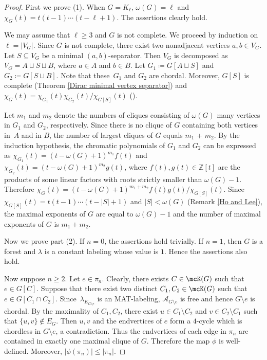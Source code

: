 \begin{proof}
First we prove (1).
When $ G = K_{\ell} $, $ \omega(G) = \ell $ and $ \chi_{G}(t) = t(t-1) \cdots (t-\ell+1) $. 
The assertions clearly hold. 

We may assume that $ \ell \geq 3 $ and $ G $ is not complete. 
We proceed by induction on~$ \ell = |V_{G}| $. 
Since $ G $ is not complete, there exist two nonadjacent vertices $ a,b \in V_{G} $. 
Let $ S \subseteq V_{G} $ be a minimal $ (a,b) $-separator. 
Then $ V_{G} $ is decomposed as $ V_{G} = A \sqcup S \sqcup B $, where $ a \in A $ and $ b \in B $. 
Let $ G_{1} \coloneqq G[A\sqcup S] $ and $ G_{2} \coloneqq G[S \sqcup B] $. 
Note that these~$ G_{1} $ and $ G_{2} $ are chordal. 
Moreover, $ G[S] $ is complete (Theorem \ref{Dirac minimal vertex separator}) and $ \chi_{G}(t) = \chi_{G_{1}}(t)\chi_{G_{2}}(t)/\chi_{G[S]}(t) $ (\eg  \cite[Theorem 3]{Read68}). 

Let $ m_{1} $ and $ m_{2} $ denote the numbers of cliques consisting of $ \omega(G) $ many vertices in $ G_{1} $ and $ G_{2} $, respectively. 
Since there is no clique of $ G $ containing both vertices in~$ A $ and in $ B $, the number of largest cliques of $ G $ equals $ m_{1} $ + $ m_{2} $. 
By the induction hypothesis, the chromatic polynomials of $ G_{1} $ and $ G_{2} $ can be expressed as $ \chi_{G_{1}}(t)  = (t-\omega(G)+1)^{m_{1}} f(t) $ and $ \chi_{G_{2}}(t) = (t-\omega(G)+1)^{m_{2}}g(t) $, where $ f(t), g(t) \in \mathbb{Z}[t] $ are the products of some linear factors with roots strictly smaller than $ \omega(G) -1$. 
Therefore $ \chi_{G}(t) = (t-\omega(G)+1)^{m_{1}+m_{2}}f(t)g(t)/\chi_{G[S]}(t) $. 
Since $ \chi_{G[S]}(t) = t(t-1) \cdots (t-|S|+1) $ and $ |S| < \omega(G) $ (Remark \ref{Ho and Lee}), the maximal exponents of $ G $ are equal to $ \omega(G)-1 $  and the number of maximal exponents of $ G $ is $ m_{1} + m_{2} $. 

Now we prove part (2). If $ n = 0 $, the assertions hold trivially. 
If $ n = 1 $, then $ G $ is a forest and $ \lambda $ is a constant labeling whose value is $ 1 $. 
Hence the assertions also hold. 

Now suppose $ n \geq 2 $. 
Let $ e \in \pi_{n} $. 
Clearly, there exists $ C\in \mcK(G)$ such that $e \in G[C]$.
Suppose that there exist two distinct $ C_{1} ,C_{2} \in \mcK(G)$ such that $ e\in G[C_{1} \cap C_{2}] $. 
Since~$ \lambda_{E_{G \setminus e}} $ is an MAT-labeling, $ \mathcal{A}_{G\setminus e} $ is free and hence $ G\setminus e $ is chordal. 
By the maximality of $ C_{1} ,C_{2}$, there exist $u\in C_{1}\setminus C_{2} $ and $v\in C_{2}\setminus C_{1} $ such that $\{u,v\} \notin E_G$.
Then $u,v$ and the endvertices of $ e$ form a $4$-cycle  which is chordless in $ G\setminus e $, a contradiction. 
Thus the endvertices of each edge in $ \pi_{n} $ are contained in exactly one maximal clique of $ G $.
Therefore the map $\phi$ is well-defined. Moreover, $ |\phi(\pi_{n})| \leq  |\pi_{n}|  $. 


\end{proof}
